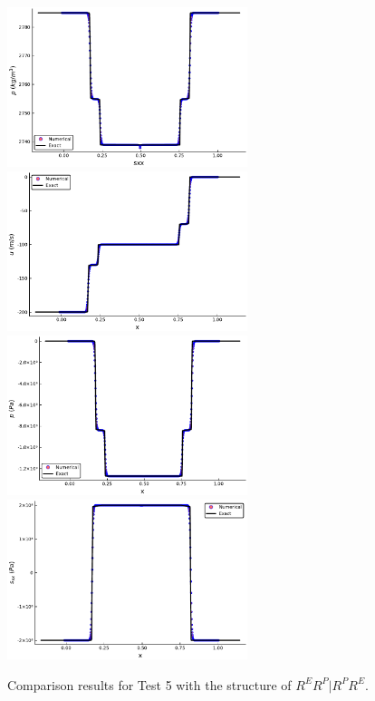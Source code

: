 \documentclass{article}
\numberwithin{equation}{section}
\numberwithin{table}{section}
\begin{document}
\begin{figure}[ht]
  \centering
 \includegraphics[width= 7cm] {case20rho.pdf}
  \includegraphics[width= 7cm] {case20u.pdf}
  \includegraphics[width= 7cm] {case20p.pdf}
  \includegraphics[width= 7cm] {case20sxx.pdf}
    \caption{Comparison results for Test 5 with the structure of $R^ER^P|R^PR^E$.  }
  \label{fig:case20}
\end{figure}
\end{document}
